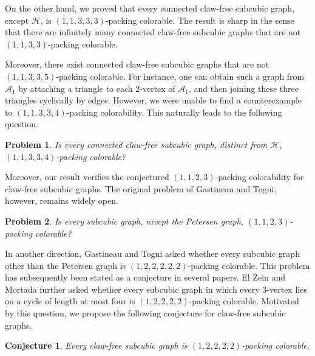 \documentclass[12pt, oneside]{scrartcl}
\newtheorem{conjecture}{Conjecture}%
\newtheorem{problem}{Problem}
\begin{document}
On the other hand, we proved that every connected claw-free subcubic graph, except $\mathcal{H}$, is $(1,1,3,3,3)$-packing colorable. The result is sharp in the sense that there are infinitely many connected claw-free subcubic graphs that are not $(1,1,3,3)$-packing colorable.

Moreover, there exist connected claw-free subcubic graphs that are not $(1,1,3,3,5)$-packing colorable. For instance, one can obtain such a graph from $\mathcal{A}_1$ by attaching a triangle to each $2$-vertex of $\mathcal{A}_1$, and then joining these three triangles cyclically by edges. However, we were unable to find a counterexample to $(1,1,3,3,4)$-packing colorability. This naturally leads to the following question.

\begin{problem}
Is every connected claw-free subcubic graph, distinct from $\mathcal{H}$, $(1,1,3,3,4)$-packing colorable?
\end{problem}

Moreover, our result verifies the conjectured $(1,1,2,3)$-packing colorability for claw-free subcubic graphs. The original problem of Gastineau and Togni, however, remains widely open.

\begin{problem}\cite{16}
Is every subcubic graph, except the Petersen graph, $(1,1,2,3)$-packing colorable?
\end{problem}

In another direction, Gastineau and Togni \cite{16} asked whether every subcubic graph other than the Petersen graph is $(1,2,2,2,2,2)$-packing colorable. This problem has subsequently been stated as a conjecture in several papers. El Zein and Mortada \cite{AM2} further asked whether every subcubic graph in which every $3$-vertex lies on a cycle of length at most four is $(1,2,2,2,2)$-packing colorable. Motivated by this question, we propose the following conjecture for claw-free subcubic graphs.

\begin{conjecture}
    Every claw-free subcubic graph is $(1,2,2,2,2)$-packing colorable.
\end{conjecture}
\end{document}
